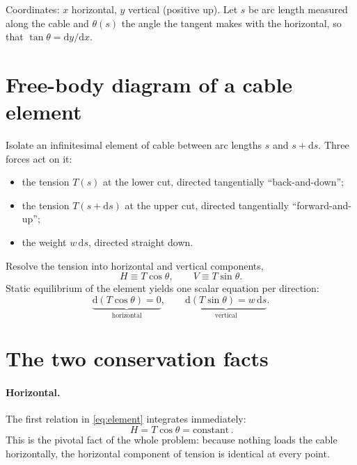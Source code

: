\documentclass[11pt]{article}
\theoremstyle{remark}
\newcommand{\dd}{\mathrm{d}}
\begin{document}
\noindent
Coordinates: $x$ horizontal, $y$ vertical (positive up). Let $s$ be arc length measured
along the cable and $\theta(s)$ the angle the tangent makes with the horizontal, so that
$\tan\theta = \dd y/\dd x$.

\section{Free-body diagram of a cable element}
Isolate an infinitesimal element of cable between arc lengths $s$ and $s+\dd s$.
Three forces act on it:
\begin{itemize}[leftmargin=*]
  \item the tension $T(s)$ at the lower cut, directed tangentially ``back-and-down'';
  \item the tension $T(s+\dd s)$ at the upper cut, directed tangentially ``forward-and-up'';
  \item the weight $w\,\dd s$, directed straight down.
\end{itemize}
Resolve the tension into horizontal and vertical components,
\begin{equation}
  H \equiv T\cos\theta, \qquad V \equiv T\sin\theta .
\end{equation}
Static equilibrium of the element yields one scalar equation per direction:
\begin{equation}
  \underbrace{\dd\!\left(T\cos\theta\right)=0}_{\text{horizontal}},
  \qquad
  \underbrace{\dd\!\left(T\sin\theta\right)=w\,\dd s}_{\text{vertical}} .
  \label{eq:element}
\end{equation}

\section{The two conservation facts}
\paragraph{Horizontal.} The first relation in \eqref{eq:element} integrates immediately:
\begin{equation}
  \boxed{\,H = T\cos\theta = \text{constant}\,}.
  \label{eq:Hconst}
\end{equation}
This is the pivotal fact of the whole problem: because nothing loads the cable
horizontally, the horizontal component of tension is identical at every point.
\end{document}
